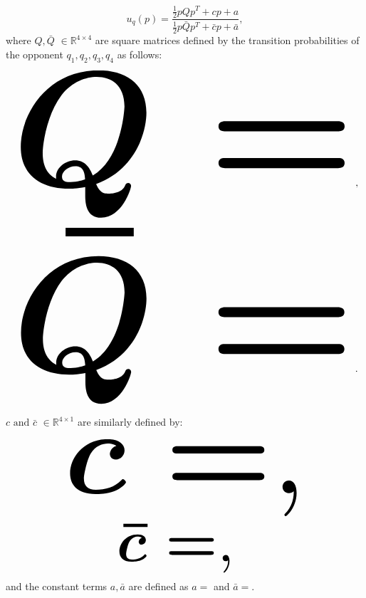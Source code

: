 \documentclass[10pt]{article}
\newcommand{\R}{\mathbb{R}}
\begin{document}
\begin{equation}\label{eq:utility_with_noise}
    u_q(p) = \frac{\frac{1}{2}pQp^T + cp + a}
                {\frac{1}{2}p\bar{Q}p^T + \bar{c}p + \bar{a}},
\end{equation}
where \(Q, \bar{Q}\) \(\in \R^{4\times4}\) are square matrices defined by the
transition probabilities of the opponent \(q_1, q_2, q_3, q_4\) as follows:

\begin{center}
\begin{equation*}
\resizebox{\linewidth}{!}{\arraycolsep=2.5pt%
\boldmath\(
Q = \)},
\end{equation*}
\begin{equation*}\label{eq:q_bar_matrix}
\resizebox{\linewidth}{!}{\arraycolsep=2.5pt%
\boldmath\(
\bar{Q} =  \)}.
\end{equation*}
\end{center}

\(c \text{ and } \bar{c}\) \(\in \R^{4 \times 1}\) are similarly defined by:

\begin{equation}\label{eq:q_matrix_numerator}
\resizebox{0.7\linewidth}{!}{\arraycolsep=2.5pt%
\boldmath\(c = \),}
\end{equation}
\begin{equation}\label{eq:q_matrix_denominator}
\resizebox{0.4\linewidth}{!}{\arraycolsep=2.5pt%
\boldmath\(\bar{c} = \),
}
\end{equation}
and the constant terms \(a, \bar{a}\) are defined as \(a = \) and
\(\bar{a} = \).
\end{document}
